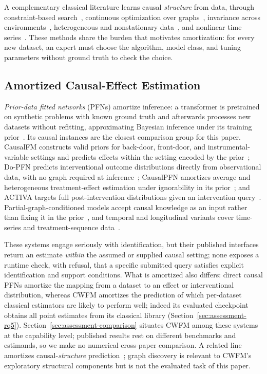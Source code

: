 \documentclass[electronics,article,submit,oneauthor]{Definitions/mdpi}
\begin{document}
A complementary classical literature learns causal \emph{structure} from data, through constraint-based search~\cite{spirtes2000causation}, continuous optimization over graphs~\cite{zheng2018notears}, invariance across environments~\cite{peters2016invariant}, heterogeneous and nonstationary data~\cite{huang2020heterogeneous}, and nonlinear time series~\cite{runge2019pcmci}. These methods share the burden that motivates amortization: for every new dataset, an expert must choose the algorithm, model class, and tuning parameters without ground truth to check the choice.

\subsection{Amortized Causal-Effect Estimation}\label{sec:related-cfm}

\emph{Prior-data fitted networks} (PFNs) amortize inference: a transformer is pretrained on synthetic problems with known ground truth and afterwards processes new datasets without refitting, approximating Bayesian inference under its training prior~\cite{muller2022pfns,hollmann2025tabpfn}. Its causal instances are the closest comparison group for this paper. CausalFM constructs valid priors for back-door, front-door, and instrumental-variable settings and predicts effects within the setting encoded by the prior~\cite{ma2025causalfm}; Do-PFN predicts interventional outcome distributions directly from observational data, with no graph required at inference~\cite{robertson2025dopfn}; CausalPFN amortizes average and heterogeneous treatment-effect estimation under ignorability in its prior~\cite{balazadeh2025causalpfn}; and ACTIVA targets full post-intervention distributions given an intervention query~\cite{sauter2025activa}. Partial-graph-conditioned models accept causal knowledge as an input rather than fixing it in the prior~\cite{reuter2026partialgraphs}, and temporal and longitudinal variants cover time-series and treatment-sequence data~\cite{thumm2026causaltimeprior,zare2026causallongpfn}.

These systems engage seriously with identification, but their published interfaces return an estimate \emph{within} the assumed or supplied causal setting; none exposes a runtime check, with refusal, that a specific submitted query satisfies explicit identification and support conditions. What is amortized also differs: direct causal PFNs amortize the mapping from a dataset to an effect or interventional distribution, whereas CWFM amortizes the prediction of which per-dataset classical estimators are likely to perform well; indeed its evaluated checkpoint obtains all point estimates from its classical library (Section~\ref{sec:assessment-rq5}). Section~\ref{sec:assessment-comparison} situates CWFM among these systems at the capability level; published results rest on different benchmarks and estimands, so we make no numerical cross-paper comparison. A related line amortizes causal-\emph{structure} prediction~\cite{thompson2026arrow,li2026tabcausal,qiao2026cdfm,reuter2026partialgraphs}; graph discovery is relevant to CWFM's exploratory structural components but is not the evaluated task of this paper.
\end{document}

